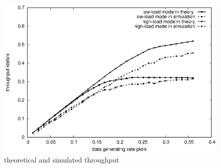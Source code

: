 \documentclass[conference]{IEEEtran}
\begin{document}
\begin{figure}[!h]
	\centering
	\includegraphics[scale=0.6]{figures/lilun.eps}
	\caption{
		theoretical and simulated throughput
	}
	\label{theory}
\end{figure}
\end{document}
